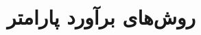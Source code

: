 \documentclass[11pt,a4paper,openany]{book}
\begin{document}
\frontmatter\tableofcontents
\mainmatter
\chapter{روش‌های برآورد پارامتر}
\end{document}

